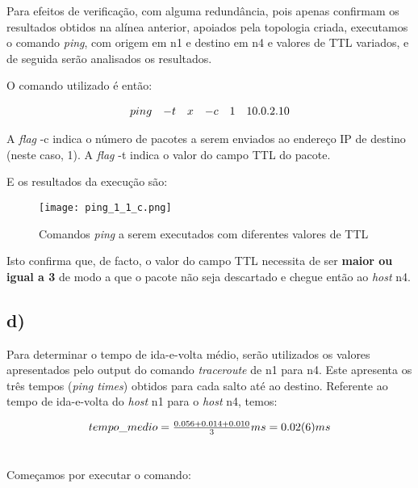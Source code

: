 \documentclass{llncs}
\begin{document}
Para efeitos de verificação, com alguma redundância, pois apenas confirmam os resultados obtidos na alínea anterior, apoiados pela topologia criada, executamos o comando \textit{ping}, com origem em n1 e destino em n4 e valores de TTL variados, e de seguida serão analisados os resultados.

O comando utilizado é então:

\[
    \begin{array}{l l l l l l}
        ping&-t& x&-c&1&10.0.2.10
    \end{array}
\]

A \textit{flag} -c indica o número de pacotes a serem enviados ao endereço IP de destino (neste caso, 1). A \textit{flag} -t indica o valor do campo TTL do pacote.

E os resultados da execução são:

\begin{figure}[!hb]
	\begin{center}
		\texttt{[image: ping\_1\_1\_c.png]}
		\caption{Comandos \textit{ping} a serem executados com diferentes valores de TTL} 
	\end{center}
\end{figure}

Isto confirma que, de facto, o valor do campo TTL necessita de ser \textbf{maior ou igual a 3} de modo a que o pacote não seja descartado e chegue então ao \textit{host} n4.

\subsection*{d)}

Para determinar o tempo de ida-e-volta médio, serão utilizados os valores apresentados pelo output do comando \textit{traceroute} de n1 para n4. Este apresenta os três tempos (\textit{ping times}) obtidos para cada salto até ao destino. 
Referente ao tempo de ida-e-volta do \textit{host} n1 para o \textit{host} n4, temos:

\[
	\begin{array} {l l l l l l}
    	tempo\_medio = \frac{0.056 + 0.014 + 0.010}{3} ms = 0.02(6) ms
	\end{array}
\]

\section{}

Começamos por executar o comando:
\end{document}
